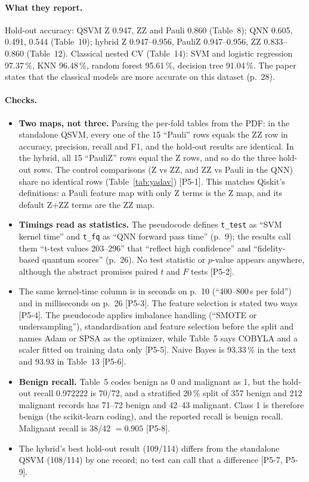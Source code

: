 \documentclass[11pt,a4paper]{article}
\newcommand{\code}[1]{\texttt{\small #1}}
\newcommand{\chk}[1]{\textsf{\small [#1]}}
\begin{document}
\paragraph{What they report.} Hold-out accuracy: QSVM Z 0.947, ZZ and Pauli 0.860 (Table~8); QNN 0.605, 0.491, 0.544 (Table~10); hybrid Z 0.947--0.956, PauliZ 0.947--0.956, ZZ 0.833--0.860 (Table~12). Classical nested CV (Table~14): SVM and logistic regression 97.37\,\%, KNN 96.48\,\%, random forest 95.61\,\%, decision tree 91.04\,\%. The paper states that the classical models are more accurate on this dataset (p.~28).

\paragraph{Checks.}
\begin{itemize}
  \item \textbf{Two maps, not three.} Parsing the per-fold tables from the PDF: in the standalone QSVM, every one of the 15 ``Pauli'' rows equals the ZZ row in accuracy, precision, recall and F1, and the hold-out results are identical. In the hybrid, all 15 ``PauliZ'' rows equal the Z rows, and so do the three hold-out rows. The control comparisons (Z vs ZZ, and ZZ vs Pauli in the QNN) share no identical rows (Table~\ref{tab:yadav}) \chk{P5-1}. This matches Qiskit's definitions: a Pauli feature map with only Z terms is the Z map, and its default Z+ZZ terms are the ZZ map.
  \item \textbf{Timings read as statistics.} The pseudocode defines \code{t\_test} as ``SVM kernel time'' and \code{t\_fq} as ``QNN forward pass time'' (p.~9); the results call them ``t-test values 203--296'' that ``reflect high confidence'' and ``fidelity-based quantum scores'' (p.~26). No test statistic or $p$-value appears anywhere, although the abstract promises paired $t$ and $F$ tests \chk{P5-2}.
  \item The same kernel-time column is in seconds on p.~10 (``400--800\,s per fold'') and in milliseconds on p.~26 \chk{P5-3}. The feature selection is stated two ways \chk{P5-4}. The pseudocode applies imbalance handling (``SMOTE or undersampling''), standardisation and feature selection before the split and names Adam or SPSA as the optimizer, while Table~5 says COBYLA and a scaler fitted on training data only \chk{P5-5}. Naive Bayes is 93.33\,\% in the text and 93.93 in Table~13 \chk{P5-6}.
  \item \textbf{Benign recall.} Table~5 codes benign as 0 and malignant as 1, but the hold-out recall 0.972222 is 70/72, and a stratified 20\,\% split of 357 benign and 212 malignant records has 71--72 benign and 42--43 malignant. Class 1 is therefore benign (the scikit-learn coding), and the reported recall is benign recall. Malignant recall is 38/42 $=0.905$ \chk{P5-8}.
  \item The hybrid's best hold-out result (109/114) differs from the standalone QSVM (108/114) by one record; no test can call that a difference \chk{P5-7, P5-9}.
\end{itemize}
\end{document}
